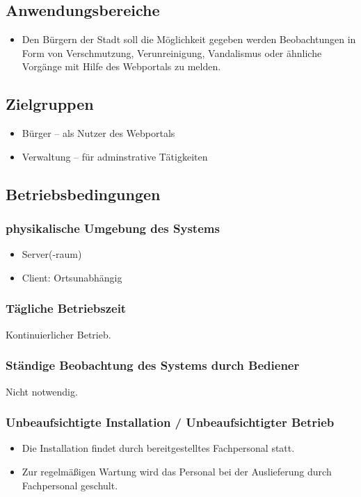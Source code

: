 \documentclass[a4paper,11pt]{scrartcl}
\begin{document}
	\subsection{Anwendungsbereiche}
		\begin{itemize}
			\item Den Bürgern der Stadt soll die Möglichkeit gegeben werden Beobachtungen in Form von Verschmutzung, Verunreinigung, Vandalismus oder ähnliche Vorgänge mit Hilfe des Webportals zu melden.
		\end{itemize}
	\subsection{Zielgruppen}
		\begin{itemize}
			\item Bürger -- als Nutzer des Webportals
			\item Verwaltung -- für adminstrative Tätigkeiten
		\end{itemize}
	\subsection{Betriebsbedingungen}
		\subsubsection{physikalische Umgebung des Systems}
			\begin{itemize}
				\item Server(-raum)
				\item Client: Ortsunabhängig
			\end{itemize}
		\subsubsection{Tägliche Betriebszeit}
			Kontinuierlicher Betrieb.
		\subsubsection{Ständige Beobachtung des Systems durch Bediener}
			Nicht notwendig.
		\subsubsection{Unbeaufsichtigte Installation / Unbeaufsichtigter Betrieb}
			\begin{itemize}
				\item Die Installation findet durch bereitgestelltes Fachpersonal statt.
				\item Zur regelmäßigen Wartung wird das Personal bei der Auslieferung durch Fachpersonal geschult.
			\end{itemize}
\end{document}
